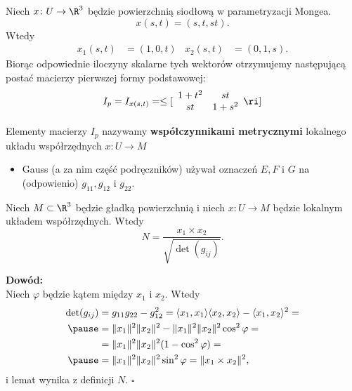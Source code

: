 \begin{frame}
\begin{przyklad}
Niech $x\colon U\to \R^3$ będzie powierzchnią siodłową w parametryzacji Mongea.
\[x(s,t)=(s,t,st).\]
\pause Wtedy 
\begin{align*}
x_1(s,t)&=(1,0,t) & x_2(s,t)&=(0,1,s).
\end{align*}
\pause Biorąc odpowiednie iloczyny skalarne tych wektorów otrzymujemy następującą postać macierzy pierwszej formy podstawowej:
\pause \[
I_{p}=I_{x(s,t)}=\le[\begin{array}{cc}
1+t^2&st\\
st & 1+s^2
\end{array}\ri]
\]

\end{przyklad}


\end{frame}
\begin{frame}[<+->]


\begin{definicja}
Elementy macierzy $I_p$ nazywamy \textbf{współczynnikami metrycznymi} lokalnego układu współrzędnych $x\colon U\to M$
\end{definicja}

\begin{uwaga}
\begin{itemize}
\item Gauss (a za nim część podręczników) używał oznaczeń $E,F$ i $G$ na (odpowienio) $g_{11},g_{12}$ i $g_{22}$.
\end{itemize}
\end{uwaga}


\end{frame}
\begin{frame}

\begin{lemat}
Niech $M\subset \R^3$ będzie gładką powierzchnią i niech $x\colon U\to M$ będzie lokalnym układem współrzędnych. Wtedy
\[N=\frac{x_1\times x_2}{\sqrt{\det(g_{ij})}}.\]
\end{lemat}
\pause \textcolor{ared}{\textbf{Dowód:}}\\\pause
Niech $\varphi$ będzie kątem między $x_1$ i $x_2$. Wtedy
\begin{align*}
\det(g_{ij})
&= g_{11}g_{22}-g_{12}^2=\langle x_1 ,x_1\rangle\langle x_2 ,x_2\rangle-\langle x_1 ,x_2\rangle^2=\\\pause
&= \|x_1\|^2\|x_2\|^2-\|x_1\|^2\|x_2\|^2\cos^2 \varphi=\\
&=\|x_1\|^2\|x_2\|^2(1-\cos^2\varphi)=\\\pause
&= \|x_1\|^2\|x_2\|^2\sin^2\varphi= \|x_1\times x_2\|^2,
\end{align*}
i lemat wynika z definicji $N$.
\hfill $\square$
\end{frame}
